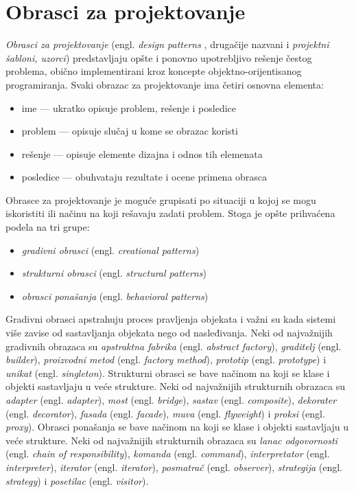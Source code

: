 \section{Obrasci za projektovanje}
\label{sec:DesignPatterns}

\emph{Obrasci za projektovanje} (engl. \emph{design patterns} \cite{DesignPatterns}, drugačije nazvani i \emph{projektni šabloni, uzorci}) predstavljaju opšte i ponovno upotrebljivo rešenje čestog problema, obično implementirani kroz koncepte objektno-orijentisanog programiranja. Svaki obrazac za projektovanje ima četiri osnovna elementa:
\begin{itemize}
    \item ime --- ukratko opisuje problem, rešenje i posledice
    \item problem --- opisuje slučaj u kome se obrazac koristi
    \item rešenje --- opisuje elemente dizajna i odnos tih elemenata
    \item posledice --- obuhvataju rezultate i ocene primena obrasca
\end{itemize}

Obrasce za projektovanje je moguće grupisati po situaciji u kojoj se mogu iskoristiti ili načinu na koji rešavaju zadati problem. Stoga je opšte prihvaćena podela na tri grupe:
\begin{itemize}
    \item \emph{gradivni obrasci} (engl. \emph{creational patterns})
    \item \emph{strukturni obrasci} (engl. \emph{structural patterns})
    \item \emph{obrasci ponašanja} (engl. \emph{behavioral patterns})
\end{itemize}

Gradivni obrasci apstrahuju proces pravljenja objekata i važni su kada sistemi više zavise od sastavljanja objekata nego od nasleđivanja. Neki od najvažnijih gradivnih obrazaca su \emph{apstraktna fabrika} (engl. \emph{abstract factory}), \emph{graditelj} (engl. \emph{builder}), \emph{proizvodni metod} (engl. \emph{factory method}), \emph{prototip} (engl. \emph{prototype}) i \emph{unikat} (engl. \emph{singleton}). Strukturni obrasci se bave načinom na koji se klase i objekti sastavljaju u veće strukture. Neki od najvažnijih strukturnih obrazaca su \emph{adapter} (engl. \emph{adapter}), \emph{most} (engl. \emph{bridge}), \emph{sastav} (engl. \emph{composite}), \emph{dekorater} (engl. \emph{decorator}), \emph{fasada} (engl. \emph{facade}), \emph{muva} (engl. \emph{flyweight}) i \emph{proksi} (engl. \emph{proxy}). Obrasci ponašanja se bave načinom na koji se klase i objekti sastavljaju u veće strukture. Neki od najvažnijih strukturnih obrazaca su \emph{lanac odgovornosti} (engl. \emph{chain of responsibility}), \emph{komanda} (engl. \emph{command}), \emph{interpretator} (engl. \emph{interpreter}), \emph{iterator} (engl. \emph{iterator}), \emph{posmatrač} (engl. \emph{observer}), \emph{strategija} (engl. \emph{strategy}) i \emph{posetilac} (engl. \emph{visitor}).

